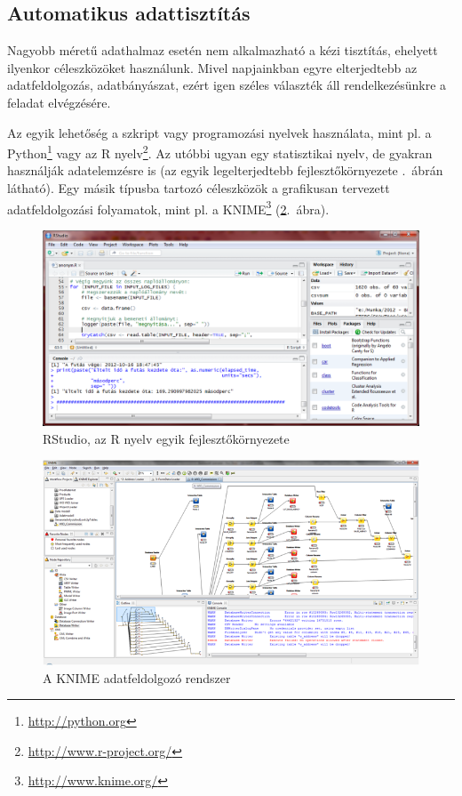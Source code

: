 \documentclass[a4paper,10pt,titlepage]{article}
\begin{document}
\subsection{Automatikus adattisztítás}

Nagyobb méretű adathalmaz esetén nem alkalmazható a kézi tisztítás, ehelyett ilyenkor céleszközöket használunk. Mivel napjainkban egyre elterjedtebb az adatfeldolgozás, adatbányászat, ezért igen széles választék áll rendelkezésünkre a feladat elvégzésére.

Az egyik lehetőség a szkript vagy programozási nyelvek használata, mint pl. a Python\footnote{\url{http://python.org}} vagy az R nyelv\footnote{\url{http://www.r-project.org/}}. Az utóbbi ugyan egy statisztikai nyelv, de gyakran használják adatelemzésre is (az egyik legelterjedtebb fejlesztőkörnyezete .~ábrán látható). Egy másik típusba tartozó céleszközök a grafikusan tervezett adatfeldolgozási folyamatok, mint pl. a KNIME\footnote{\url{http://www.knime.org/}} (\ref{fig:knime}.~ábra). 

\begin{figure}[h!]
\centering
\includegraphics[width=1.00\textwidth]{figures/RStudio.png}
\caption{RStudio, az R nyelv egyik fejlesztőkörnyezete \label{fig:RStudio}}
\end{figure}

\begin{figure}[h!]
\centering
\includegraphics[width=1.00\textwidth]{figures/knime.png}
\caption{A KNIME adatfeldolgozó rendszer \label{fig:knime}}
\end{figure}
\end{document}
